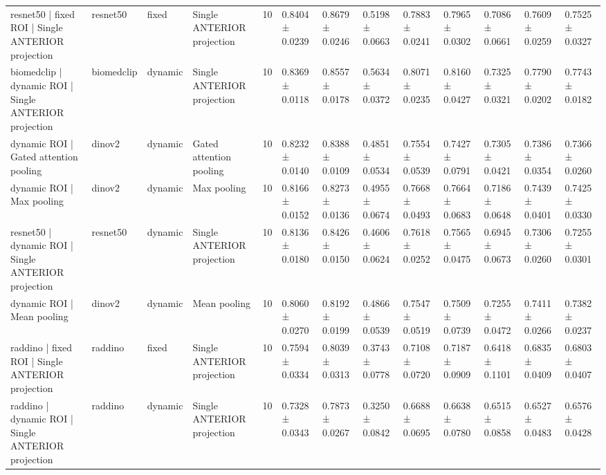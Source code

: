 \begin{table}
\begin{tabular}{llllrllllllll}
resnet50 | fixed ROI | Single ANTERIOR projection & resnet50 & fixed & Single ANTERIOR projection & 10 & 0.8404 ± 0.0239 & 0.8679 ± 0.0246 & 0.5198 ± 0.0663 & 0.7883 ± 0.0241 & 0.7965 ± 0.0302 & 0.7086 ± 0.0661 & 0.7609 ± 0.0259 & 0.7525 ± 0.0327 \\
biomedclip | dynamic ROI | Single ANTERIOR projection & biomedclip & dynamic & Single ANTERIOR projection & 10 & 0.8369 ± 0.0118 & 0.8557 ± 0.0178 & 0.5634 ± 0.0372 & 0.8071 ± 0.0235 & 0.8160 ± 0.0427 & 0.7325 ± 0.0321 & 0.7790 ± 0.0202 & 0.7743 ± 0.0182 \\
dynamic ROI | Gated attention pooling & dinov2 & dynamic & Gated attention pooling & 10 & 0.8232 ± 0.0140 & 0.8388 ± 0.0109 & 0.4851 ± 0.0534 & 0.7554 ± 0.0539 & 0.7427 ± 0.0791 & 0.7305 ± 0.0421 & 0.7386 ± 0.0354 & 0.7366 ± 0.0260 \\
dynamic ROI | Max pooling & dinov2 & dynamic & Max pooling & 10 & 0.8166 ± 0.0152 & 0.8273 ± 0.0136 & 0.4955 ± 0.0674 & 0.7668 ± 0.0493 & 0.7664 ± 0.0683 & 0.7186 ± 0.0648 & 0.7439 ± 0.0401 & 0.7425 ± 0.0330 \\
resnet50 | dynamic ROI | Single ANTERIOR projection & resnet50 & dynamic & Single ANTERIOR projection & 10 & 0.8136 ± 0.0180 & 0.8426 ± 0.0150 & 0.4606 ± 0.0624 & 0.7618 ± 0.0252 & 0.7565 ± 0.0475 & 0.6945 ± 0.0673 & 0.7306 ± 0.0260 & 0.7255 ± 0.0301 \\
dynamic ROI | Mean pooling & dinov2 & dynamic & Mean pooling & 10 & 0.8060 ± 0.0270 & 0.8192 ± 0.0199 & 0.4866 ± 0.0539 & 0.7547 ± 0.0519 & 0.7509 ± 0.0739 & 0.7255 ± 0.0472 & 0.7411 ± 0.0266 & 0.7382 ± 0.0237 \\
raddino | fixed ROI | Single ANTERIOR projection & raddino & fixed & Single ANTERIOR projection & 10 & 0.7594 ± 0.0334 & 0.8039 ± 0.0313 & 0.3743 ± 0.0778 & 0.7108 ± 0.0720 & 0.7187 ± 0.0909 & 0.6418 ± 0.1101 & 0.6835 ± 0.0409 & 0.6803 ± 0.0407 \\
raddino | dynamic ROI | Single ANTERIOR projection & raddino & dynamic & Single ANTERIOR projection & 10 & 0.7328 ± 0.0343 & 0.7873 ± 0.0267 & 0.3250 ± 0.0842 & 0.6688 ± 0.0695 & 0.6638 ± 0.0780 & 0.6515 ± 0.0858 & 0.6527 ± 0.0483 & 0.6576 ± 0.0428 \\
\bottomrule
\end{tabular}
\end{table}
